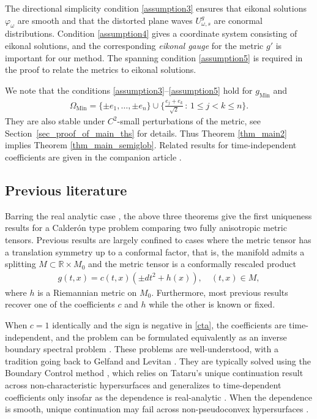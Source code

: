 \documentclass[11pt,letterpaper]{amsart}
\theoremstyle{definition}
\numberwithin{equation}{section}
\newcommand{\gm}{g_{\mathrm{Min}}}
\def\R{\mathbb R}
\def\mid{\,:\,}
\begin{document}
The directional simplicity condition \eqref{assumption3} ensures that eikonal solutions $\varphi_{\omega}$ are smooth and that the distorted plane waves $U_{\omega,s}^g$ are conormal distributions. Condition \eqref{assumption4} gives a coordinate system consisting of eikonal solutions, and the corresponding \emph{eikonal gauge} for the metric $g'$ is important for our method. The spanning condition \eqref{assumption5} is required in the proof to relate the metrics to eikonal solutions.

We note that the conditions \eqref{assumption3}--\eqref{assumption5} hold for $\gm$ and
    \begin{align*}
\Omega_{\mathrm{Min}} = \{ \pm e_1, \ldots, \pm e_n \} \cup \{ \frac{e_j+e_k}{\sqrt{2}} \mid 1 \leq j < k \leq n \}.
    \end{align*}
They are also stable under $C^{2}$-small perturbations of the metric, see Section~\ref{sec_proof_of_main_ths} for details. Thus Theorem \ref{thm_main2} implies Theorem \ref{thm_main_semiglob}. Related results for time-independent coefficients %
are given in the companion article \cite{rakesh2026}.


\subsection{Previous literature}

Barring the real analytic case \cite{lee1989, lassas2001}, the above three theorems give the first uniqueness results for a Calder\'on type problem comparing two fully anisotropic metric tensors. Previous results are largely confined to cases where the metric tensor has a translation symmetry up to a conformal factor, that is, the manifold admits a splitting $M \subset \R \times M_0$ and the metric tensor is a conformally rescaled product 
    \begin{align}\label{cta}
g(t, x) = c(t, x) (\pm dt^2 + h(x)), \quad (t, x) \in M,
    \end{align}
where $h$ is a Riemannian metric on $M_0$. Furthermore, most previous results recover one of the coefficients $c$ and $h$ while the other is known or fixed. 

When $c = 1$ identically and the sign is negative in \eqref{cta}, the coefficients are time-independent, and the problem can be formulated equivalently as an inverse boundary spectral problem \cite{katchalov2001}. These problems are well-understood, with a tradition going back to Gelfand and Levitan \cite{Gelfand1951, gelfand1957}. They are typically solved using the Boundary Control method \cite{belishev1988}, which relies on Tataru's unique continuation result across non-characteristic hypersurfaces \cite{tataru1995} and generalizes to time-dependent coefficients only insofar as the dependence is real-analytic \cite{eskin2007}. When the dependence is smooth, unique continuation may fail across non-pseudoconvex hypersurfaces \cite{alinhac1983}.
\end{document}

